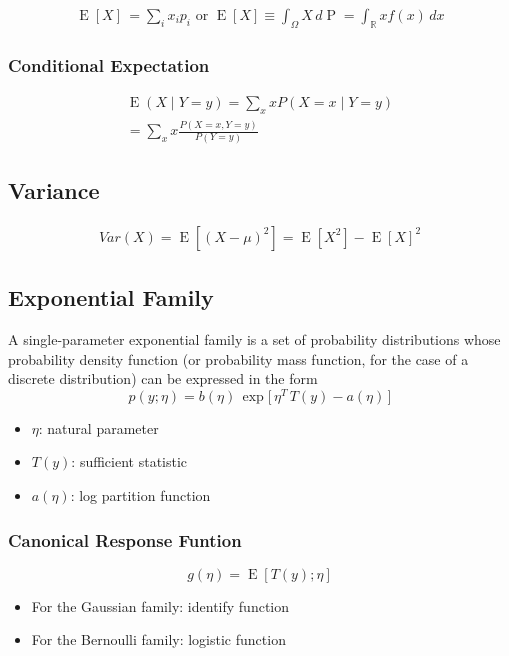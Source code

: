 \documentclass[8pt, a4paper, landscape, includeheadfoot]{extarticle}
\begin{document}
\begin{multicols*}{4}
\begin{align*}
	\operatorname{E}[X] \,= \sum_i x_i p_i \text{ or } \operatorname{E}[X]\equiv\int_\Omega X\,d\operatorname{P}=\int_{\mathbb{R}}xf(x)\,dx
\end{align*}

\subsubsection{Conditional Expectation}{}
\begin{align*}
	\operatorname{E} (X \mid Y=y) =  \sum_x x P(X = x \mid Y = y) \\
	= \sum_x x \frac{P(X = x, Y = y)}{P(Y=y)}
\end{align*}
\subsection{Variance}
\begin{align*}
	Var(X) = \operatorname{E}[\left(X-\mu\right)^2] = \operatorname{E}[X^2] - \operatorname{E}[X]^2
\end{align*}
\subsection{Exponential Family}
A single-parameter exponential family is a set of probability distributions 
whose probability density function (or probability mass function, for the case of a discrete distribution) can be expressed in the form
$$
p(y;\eta) = b(\eta)\,\exp\bigl[\,\eta^T \, T(y) - a(\eta)\,\bigr]
$$
\begin{itemize}[itemsep=0pt]
	\item $\eta$: natural parameter
	\item $T(y)$: sufficient statistic
	\item $a(\eta)$: log partition function
\end{itemize}

\subsubsection{Canonical Response Funtion}{}
$$
g(\eta) = \operatorname{E}[T(y);\eta]
$$
\begin{itemize}[itemsep=0pt]
	\item For the Gaussian family: identify function
	\item For the Bernoulli family: logistic function
\end{itemize}

\end{multicols*}
\end{document}
